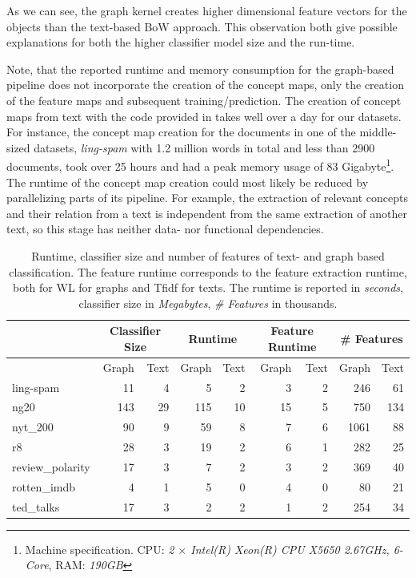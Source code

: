 As we can see, the graph kernel creates higher dimensional feature vectors for the objects than the text-based BoW approach. 
This observation both give possible explanations for both the higher classifier model size and the run-time.

Note, that the reported runtime and memory consumption for the graph-based pipeline does not incorporate the creation of the concept maps, only the creation of the feature maps and subsequent training/prediction.
The creation of concept maps from text with the code provided in \cite{Falke2017b} takes well over a day for our datasets.
For instance, the concept map creation for the documents  in one of the middle-sized datasets, \textit{ling-spam} with 1.2 million words in total and less than 2900 documents, took over 25 hours and had a peak memory usage of 83 Gigabyte\footnote{Machine specification. CPU: \textit{2 $\times$ Intel(R) Xeon(R) CPU X5650 \@ 2.67GHz, 6-Core}, RAM: \textit{190GB}}.
The runtime of the concept map creation could most likely be reduced by parallelizing parts of its pipeline.
For example, the extraction of relevant concepts and their relation from a text is independent from the same extraction of another text, so this stage has neither data- nor functional dependencies.


\begin{table}[htb!]
	\centering
	\begin{tabular}{lrrrrrrrr}
		& \multicolumn{2}{c}{Classifier Size} &  \multicolumn{2}{c}{Runtime} &  \multicolumn{2}{c}{Feature Runtime} &  \multicolumn{2}{c}{\# Features} \\
		\midrule
		&  Graph &  Text &  Graph &  Text & Graph &  Text  & Graph &  Text \\
		\midrule
ling-spam       & 11 & 4 & 5 & 2 & 3 & 2 & 246 & 61 \\
ng20            & 143 & 29 & 115 & 10 & 15 & 5 & 750 & 134 \\
nyt\_200         & 90 & 9 & 59 & 8 & 7 & 6 & 1061 & 88 \\
r8              & 28 & 3 & 19 & 2 & 6 & 1 & 282 & 25 \\
review\_polarity & 17 & 3 & 7 & 2 & 3 & 2 & 369 & 40 \\
rotten\_imdb     & 4 & 1 & 5 & 0 & 4 & 0 & 80 & 21 \\
ted\_talks       & 17 & 3 & 2 & 2 & 1 & 2 & 254 & 34 \\
		\bottomrule
	\end{tabular}
\caption[Table: Runtime, classifier size and \# features for graph- and text based classification.]{
	Runtime, classifier size and number of features of text- and graph based classification.
	The feature runtime corresponds to the feature extraction runtime, both for WL for graphs and Tfidf for texts.
	The runtime is reported in \textit{seconds}, classifier size in \textit{Megabytes}, \textit{\# Features} in thousands.
}
\label{table:runtime_and_classifier_size}
\end{table}

